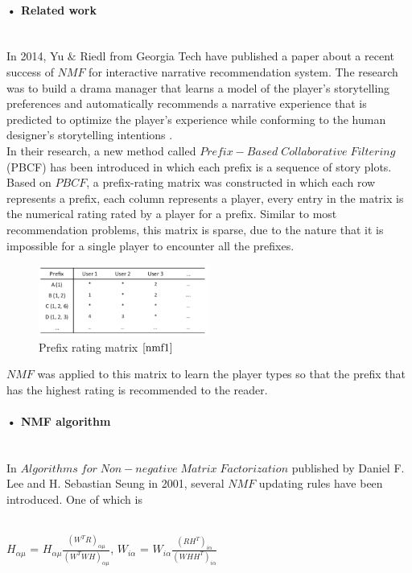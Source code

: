 \documentclass[11pt]{article} %
\begin{document}
\paragraph{• Related work}\mbox{}\\
In 2014, Yu $\&$ Riedl from Georgia Tech have published a paper\cite{nmf1} about a recent success of $NMF$ for interactive narrative recommendation system. The research was to build a drama manager that learns a model of the player’s storytelling preferences and automatically recommends a narrative experience that is predicted to optimize the player’s experience while conforming to the human designer’s storytelling intentions \cite[p.~1]{nmf1}.\\
In their research, a new method called $Prefix-Based\;Collaborative\;Filtering$ (PBCF) \cite[p.~2]{nmf1} has been introduced in which each prefix is a sequence of story plots. Based on $PBCF$, a prefix-rating matrix was constructed in which each row represents a prefix, each column represents a player, every entry in the matrix is the numerical rating rated by a player for a prefix. Similar to most recommendation problems, this matrix is sparse, due to the nature that it is impossible for a single player to encounter all the prefixes.
\begin{figure}[H]
\caption{Prefix rating matrix $\cite[p.~4]{nmf1}$}
\centering
\includegraphics[width=0.5\textwidth]{prefixrating}
\end{figure}
$NMF$ was applied to this matrix to learn the player types so that the prefix that has the highest rating is recommended to the reader.
\paragraph{• NMF algorithm}\mbox{}\\
In $Algorithms\;for\;Non-negative\;Matrix\; Factorization$ published by Daniel F. Lee and H. Sebastian Seung in 2001, several $NMF$ updating rules have been introduced. One of which is\\\\
\centerline{$H_{\alpha\mu}$ = $H_{\alpha\mu}\frac{(W^{T}R)_{\alpha\mu}}{(W^{T}WH)_{\alpha\mu}}$, $W_{i\alpha}$ = $W_{i\alpha}\frac{(RH^{T})_{i\alpha}}{(WHH^{T})_{i\alpha}}$ \cite[p.~3]{nmfalg}}\\\\
\end{document}
